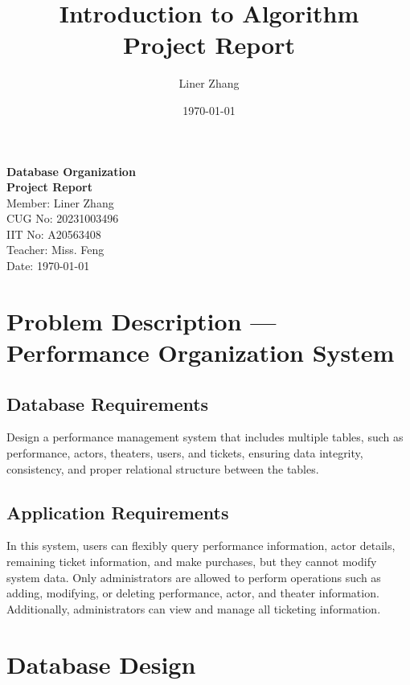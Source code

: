 \documentclass[12pt]{article}
\title{Introduction to Algorithm \\ Project Report}  %
\author{Liner Zhang}   %
\date{\today}          %
\begin{document}
\fontsize{12}{15}\selectfont  %

\begin{titlepage}
    \centering
    \vfill
    \Huge \textbf{Database Organization} \\[0.5cm]  %
    \Huge \textbf{Project Report} \\[10.0cm]  %
    \Large Member: Liner Zhang \\[0.5cm]
    \Large CUG No: 20231003496  \\[0.5cm]
    \Large IIT No: A20563408 \\[0.5cm]
    \Large Teacher: Miss. Feng\\[0.5cm]
    \Large Date: \today \\[2.0cm]
\end{titlepage}

\tableofcontents  %
\newpage

\section{Problem Description — Performance Organization System}

\subsection{Database Requirements}
Design a performance management system that includes multiple tables, such as performance, actors, theaters, users, and tickets, ensuring data integrity, consistency, and proper relational structure between the tables.

\subsection{Application Requirements}
In this system, users can flexibly query performance information, actor details, remaining ticket information, and make purchases, but they cannot modify system data. Only administrators are allowed to perform operations such as adding, modifying, or deleting performance, actor, and theater information. Additionally, administrators can view and manage all ticketing information.

\section{Database Design}
\end{document}
